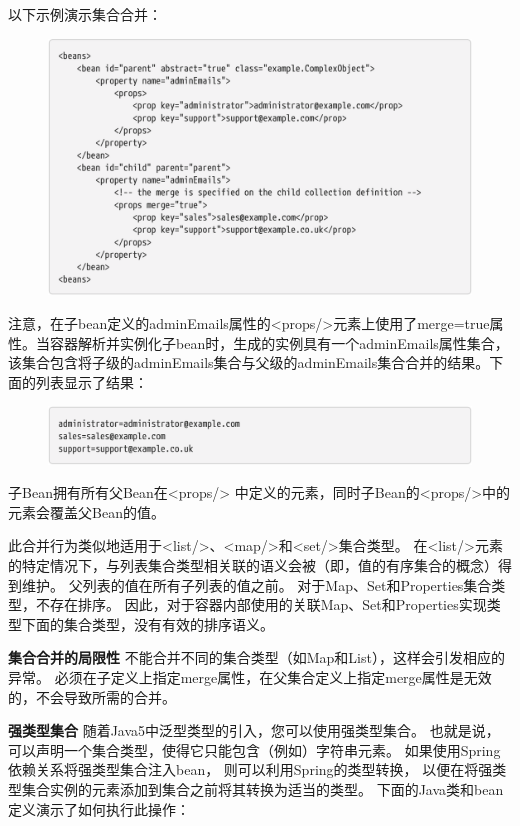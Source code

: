 以下示例演示集合合并：

\begin{figure}[ht]
    \centering
    \includegraphics[width=1\linewidth]{./Figure/IMG_code_43.png}
\end{figure}

注意，在子bean定义的adminEmails属性的<props/>元素上使用了merge=true属性。当容器解析并实例化子bean时，生成的实例具有一个adminEmails属性集合，该集合包含将子级的adminEmails集合与父级的adminEmails集合合并的结果。下面的列表显示了结果：

\begin{figure}[ht]
    \centering
    \includegraphics[width=1\linewidth]{./Figure/IMG_code_44.png}
\end{figure}


子Bean拥有所有父Bean在<props/> 中定义的元素，同时子Bean的<props/>中的元素会覆盖父Bean的值。

此合并行为类似地适用于<list/>、<map/>和<set/>集合类型。
在<list/>元素的特定情况下，与列表集合类型相关联的语义会被（即，值的有序集合的概念）得到维护。
父列表的值在所有子列表的值之前。
对于Map、Set和Properties集合类型，不存在排序。
因此，对于容器内部使用的关联Map、Set和Properties实现类型下面的集合类型，没有有效的排序语义。

\textbf{集合合并的局限性}
不能合并不同的集合类型（如Map和List），这样会引发相应的异常。
必须在子定义上指定merge属性，在父集合定义上指定merge属性是无效的，不会导致所需的合并。

\textbf{强类型集合}
随着Java5中泛型类型的引入，您可以使用强类型集合。
也就是说，可以声明一个集合类型，使得它只能包含（例如）字符串元素。
如果使用Spring依赖关系将强类型集合注入bean，
则可以利用Spring的类型转换，
以便在将强类型集合实例的元素添加到集合之前将其转换为适当的类型。
下面的Java类和bean定义演示了如何执行此操作：

